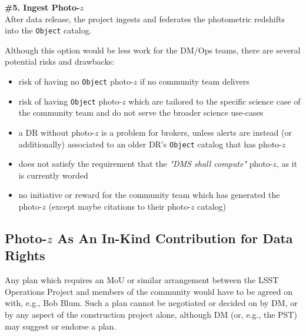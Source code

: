 \documentclass[DM,lsstdraft,toc]{lsstdoc}
\begin{document}
{\bf \#5. Ingest Photo-$z$}\\
After data release, the project ingests and federates the photometric redshifts into the {\tt Object} catalog.

Although this option would be less work for the DM/Ops teams, there are several potential risks and drawbacks:

\begin{itemize}%
\item risk of having no {\tt Object} photo-$z$ if no community team delivers
\item risk of having {\tt Object} photo-$z$ which are tailored to the specific science case of the community team and do not serve the broader science use-cases
\item a DR without photo-$z$ is a problem for brokers, unless alerts are instead (or additionally) associated to an older DR's {\tt Object} catalog that has photo-$z$
\item does not satisfy the requirement that the {\it "DMS shall compute"} photo-$z$, as it is currently worded
\item no initiative or reward for the community team which has generated the photo-$z$ (except maybe citations to their photo-$z$ catalog)
\end{itemize}

\subsection{Photo-$z$ As An In-Kind Contribution for Data Rights}\label{ssec:dmingest_inkind}

Any plan which requires an MoU or similar arrangement between the LSST Operations Project and members of the community would have to be agreed on with, e.g., Bob Blum.
Such a plan cannot be negotiated or decided on by DM, or by any aspect of the construction project alone, although DM (or, e.g., the PST) may suggest or endorse a plan.


\end{document}

